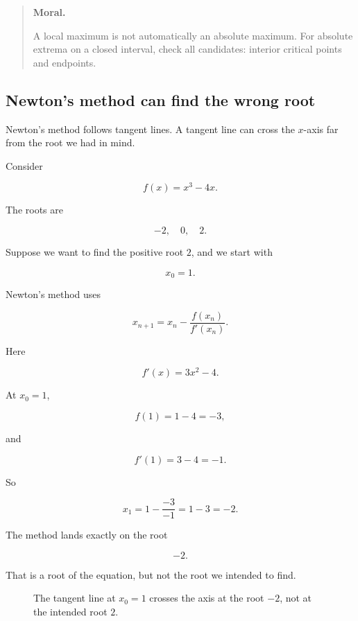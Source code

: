 \begin{quote}
\textbf{Moral.}

A local maximum is not automatically an absolute maximum.  For absolute extrema on
a closed interval, check all candidates: interior critical points and endpoints.
\end{quote}

\subsection{Newton's method can find the wrong root}
\label{subsec:newton-wrong-root}

Newton's method follows tangent lines.  A tangent line can cross the \(x\)-axis far
from the root we had in mind.

Consider

\[
f(x)=x^3-4x.
\]

The roots are

\[
-2,\quad 0,\quad 2.
\]

Suppose we want to find the positive root \(2\), and we start with

\[
x_0=1.
\]

Newton's method uses

\[
x_{n+1}=x_n-\frac{f(x_n)}{f'(x_n)}.
\]

Here

\[
f'(x)=3x^2-4.
\]

At \(x_0=1\),

\[
f(1)=1-4=-3,
\]

and

\[
f'(1)=3-4=-1.
\]

So

\[
x_1
=
1-\frac{-3}{-1}
=
1-3
=
-2.
\]

The method lands exactly on the root

\[
-2.
\]

That is a root of the equation, but not the root we intended to find.

\begin{figure}[h]
\centering
{}
\caption{The tangent line at \(x_0=1\) crosses the axis at the root \(-2\), not at the intended root \(2\).}
\label{fig:newton-wrong-root}
\end{figure}

